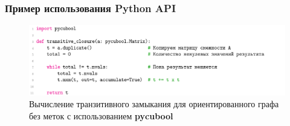 \documentclass[aspectratio=169,xcolor=table,english]{beamer}
\begin{document}
\begin{frame}[fragile] \frametitle{Пример использования Python API}
    \begin{center}
     \begin{minipage}[m]{0.9\linewidth}
        \begin{figure}
            \centering
            \includegraphics[width=\textwidth]{figures/tc_python_api.png}
            \caption{Вычисление транзитивного замыкания для ориентированного графа без меток с использованием \textbf{pycubool}}
        \end{figure}
    \end{minipage}\hfill   
    \end{center}
\end{frame}

\end{document}
